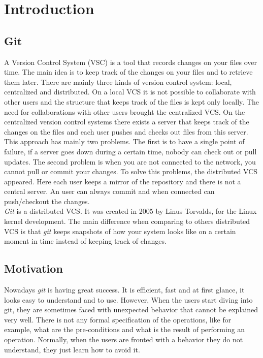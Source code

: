 \chapter{Introduction}
\section{Git}
A Version Control System (VSC) is a tool that records changes on your
files over time. The main idea is to keep track of the changes on your
files and to retrieve them later. There are mainly three kinds of 
version control system: local, centralized and distributed. On
a local VCS it is not possible to collaborate with other users and
the structure that keeps track of the files is kept only locally. The
need for collaborations with other users brought the centralized VCS.
On the centralized version control systems there exists a server that keeps
track of the changes on the files and each user pushes and checks out files
from this server. This approach has mainly two problems. The
first is to have a single point of failure, if a server goes down
during a certain time, nobody can check out or pull updates. The
second problem is when you are not connected to the network, you
cannot pull or commit your changes. To solve this problems, the
distributed VCS appeared. Here each user keeps a mirror of the
repository and there is not a central server. An user can always commit
and when connected can push/checkout the changes.\\

\emph{Git} \cite{progit,gitComm} is a distributed VCS. It was created in 2005 by Linus Torvalds,
for the Linux kernel development. The main difference when comparing to
others distributed VCS is that \emph{git} keeps snapshots of how your system
looks like on a certain moment in time instead of keeping track of
changes.

\section{Motivation}
Nowadays \emph{git} is having great success. It is efficient, fast and
at first glance, it looks easy to understand and to use. However, When
the users start diving into git, they are sometimes faced with unexpected behavior that
cannot be explained very well. There is not any formal
specification of the operations, like for example, what are the pre-conditions and
what is the result of performing an operation. Normally, when the users
are fronted with a behavior they do not understand, they just learn how to avoid it.\\

